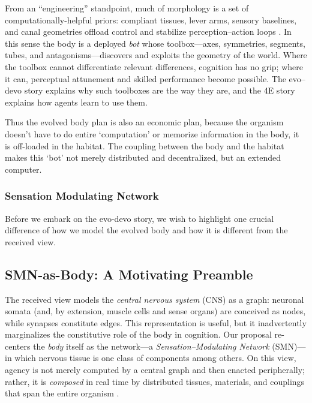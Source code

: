 From an “engineering” standpoint, much of morphology is a set of computationally-helpful priors: compliant tissues, lever arms, sensory baselines, and canal geometries offload control and stabilize perception–action loops \citep{pfeifer2007body}. In this sense the body is a deployed \emph{bot} whose toolbox—axes, symmetries, segments, tubes, and antagonisms—discovers and exploits the geometry of the world. Where the toolbox cannot differentiate relevant differences, cognition has no grip; where it can, perceptual attunement and skilled performance become possible. The evo–devo story explains why such toolboxes are the way they are, and the 4E story explains how agents learn to use them.

Thus the evolved body plan is also an economic plan, because the organism doesn't have to do entire `computation' or memorize information in the body, it is off-loaded in the habitat.  The coupling between the body and the habitat makes this `bot' not merely distributed and decentralized, but an extended computer. 

\subsubsection{Sensation Modulating Network}\label{smn1}

Before we embark on the evo-devo story, we wish to highlight one crucial difference of how we model the evolved body and how it is different from the received view. 

\subsection{SMN-as-Body: A Motivating Preamble}
\label{subsec:smn_preamble}

The received view models the \emph{central nervous system} (CNS) as a graph: neuronal somata (and, by extension, muscle cells and sense organs) are conceived as nodes, while synapses constitute edges. This representation is useful, but it inadvertently marginalizes the constitutive role of the body in cognition. Our proposal re-centers the \emph{body} itself as the network---a \emph{Sensation–Modulating Network} (SMN)---in which nervous tissue is one class of components among others. On this view, agency is not merely computed by a central graph and then enacted peripherally; rather, it is \emph{composed} in real time by distributed tissues, materials, and couplings that span the entire organism \citep{Kelso1995,PezzuloCisek2016,Gallagher2017}.

